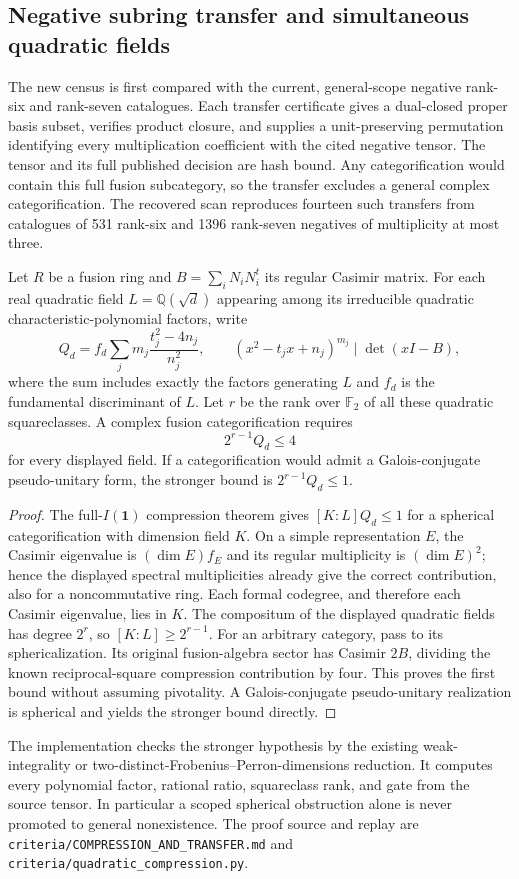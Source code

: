 \subsection{Negative subring transfer and simultaneous quadratic fields}
\label{subsec:m3-transfer-compression}
The new census is first compared with the current, general-scope negative
rank-six and rank-seven catalogues.  Each transfer certificate gives a
dual-closed proper basis subset, verifies product closure, and supplies a
unit-preserving permutation identifying every multiplication coefficient
with the cited negative tensor.  The tensor and its full published decision
are hash bound.  Any categorification would contain this full fusion
subcategory, so the transfer excludes a general complex categorification.
The recovered scan reproduces fourteen such transfers from catalogues of
531 rank-six and 1396 rank-seven negatives of multiplicity at most three.

\begin{proposition}
Let $R$ be a fusion ring and $B=\sum_iN_iN_i^t$ its regular Casimir matrix.
For each real quadratic field $L=\mathbb Q(\sqrt d)$ appearing among its
irreducible quadratic characteristic-polynomial factors, write
\[
 Q_d=f_d\sum_j m_j\frac{t_j^2-4n_j}{n_j^2},
 \qquad (x^2-t_jx+n_j)^{m_j}\mid\det(xI-B),
\]
where the sum includes exactly the factors generating $L$ and $f_d$ is
the fundamental discriminant of $L$.  Let $r$ be the rank over
$\mathbb F_2$ of all these quadratic squareclasses.  A complex fusion
categorification requires
\[
                 2^{r-1}Q_d\leq4
\]
for every displayed field.  If a categorification would admit a
Galois-conjugate pseudo-unitary form, the stronger bound is
$2^{r-1}Q_d\leq1$.
\end{proposition}
\begin{proof}
The full-$I(\mathbf1)$ compression theorem gives
$[K:L]Q_d\leq1$ for a spherical categorification with dimension field $K$.
On a simple representation $E$, the Casimir eigenvalue is
$(\dim E)f_E$ and its regular multiplicity is $(\dim E)^2$; hence the
displayed spectral multiplicities already give the correct contribution,
also for a noncommutative ring.  Each formal codegree, and therefore each
Casimir eigenvalue, lies in $K$.  The compositum of the displayed quadratic
fields has degree $2^r$, so $[K:L]\geq2^{r-1}$.
For an arbitrary category, pass to its sphericalization.  Its original
fusion-algebra sector has Casimir $2B$, dividing the known reciprocal-square
compression contribution by four.  This proves the first bound without
assuming pivotality.  A Galois-conjugate pseudo-unitary realization is
spherical and yields the stronger bound directly.
\end{proof}
The implementation checks the stronger hypothesis by the existing
weak-integrality or two-distinct-Frobenius--Perron-dimensions reduction.
It computes every polynomial factor, rational ratio, squareclass rank, and
gate from the source tensor.  In particular a scoped spherical obstruction
alone is never promoted to general nonexistence.  The proof source and
replay are \texttt{criteria/COMPRESSION\_AND\_TRANSFER.md} and
\texttt{criteria/quadratic\_compression.py}.

